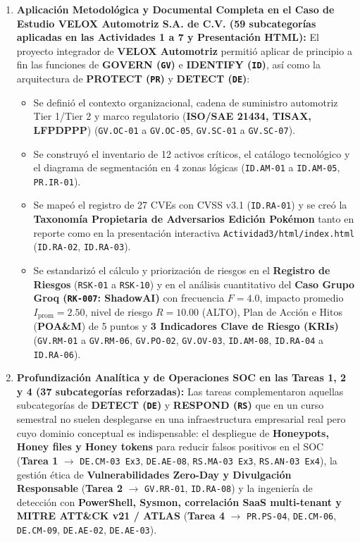 \documentclass[letterpaper,11pt]{article}
\begin{document}
\begin{enumerate}[leftmargin=1.1cm, itemsep=4pt]
    \item \textbf{Aplicación Metodológica y Documental Completa en el Caso de Estudio VELOX Automotriz S.A. de C.V. (\textbf{59 subcategorías} aplicadas en las Actividades 1 a 7 y Presentación HTML):}
    El proyecto integrador de \textbf{VELOX Automotriz} permitió aplicar de principio a fin las funciones de \textbf{GOVERN (\texttt{GV})} e \textbf{IDENTIFY (\texttt{ID})}, así como la arquitectura de \textbf{PROTECT (\texttt{PR})} y \textbf{DETECT (\texttt{DE})}:
    \begin{itemize}[leftmargin=0.8cm, itemsep=2pt]
        \item Se definió el contexto organizacional, cadena de suministro automotriz Tier 1/Tier 2 y marco regulatorio (\textbf{ISO/SAE 21434, TISAX, LFPDPPP}) (\texttt{GV.OC-01} a \texttt{GV.OC-05}, \texttt{GV.SC-01} a \texttt{GV.SC-07}).
        \item Se construyó el inventario de 12 activos críticos, el catálogo tecnológico y el diagrama de segmentación en 4 zonas lógicas (\texttt{ID.AM-01} a \texttt{ID.AM-05}, \texttt{PR.IR-01}).
        \item Se mapeó el registro de 27 CVEs con CVSS v3.1 (\texttt{ID.RA-01}) y se creó la \textbf{Taxonomía Propietaria de Adversarios Edición Pokémon} tanto en reporte como en la presentación interactiva \texttt{Actividad3/html/index.html} (\texttt{ID.RA-02}, \texttt{ID.RA-03}).
        \item Se estandarizó el cálculo y priorización de riesgos en el \textbf{Registro de Riesgos} (\texttt{RSK-01} a \texttt{RSK-10}) y en el análisis cuantitativo del \textbf{Caso Grupo Groq (\texttt{RK-007}: ShadowAI)} con frecuencia $F=4.0$, impacto promedio $I_{\text{prom}}=2.50$, nivel de riesgo $R=10.00$ (ALTO), Plan de Acción e Hitos (\textbf{POA\&M}) de 5 puntos y \textbf{3 Indicadores Clave de Riesgo (KRIs)} (\texttt{GV.RM-01} a \texttt{GV.RM-06}, \texttt{GV.PO-02}, \texttt{GV.OV-03}, \texttt{ID.AM-08}, \texttt{ID.RA-04} a \texttt{ID.RA-06}).
    \end{itemize}

    \item \textbf{Profundización Analítica y de Operaciones SOC en las Tareas 1, 2 y 4 (\textbf{37 subcategorías} reforzadas):}
    Las tareas complementaron aquellas subcategorías de \textbf{DETECT (\texttt{DE})} y \textbf{RESPOND (\texttt{RS})} que en un curso semestral no suelen desplegarse en una infraestructura empresarial real pero cuyo dominio conceptual es indispensable: el despliegue de \textbf{Honeypots, Honey files y Honey tokens} para reducir falsos positivos en el SOC (\textbf{Tarea 1} $\rightarrow$ \texttt{DE.CM-03 Ex3}, \texttt{DE.AE-08}, \texttt{RS.MA-03 Ex3}, \texttt{RS.AN-03 Ex4}), la gestión ética de \textbf{Vulnerabilidades Zero-Day y Divulgación Responsable} (\textbf{Tarea 2} $\rightarrow$ \texttt{GV.RR-01}, \texttt{ID.RA-08}) y la ingeniería de detección con \textbf{PowerShell, Sysmon, correlación SaaS multi-tenant y MITRE ATT\&CK v21 / ATLAS} (\textbf{Tarea 4} $\rightarrow$ \texttt{PR.PS-04}, \texttt{DE.CM-06}, \texttt{DE.CM-09}, \texttt{DE.AE-02}, \texttt{DE.AE-03}).
\end{enumerate}

\newpage
\printbibliography[title={Referencias Bibliográficas}]
\end{document}
